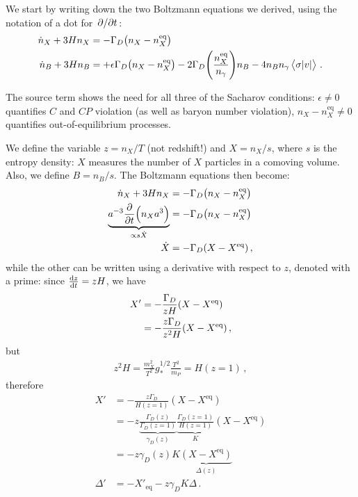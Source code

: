 \documentclass[main.tex]{subfiles}
\begin{document}

We start by writing down the two Boltzmann equations we derived, using the notation of a dot for \(\pdv*{}{t}\):
%
\begin{align}
\dot{n}_X + 3 H n_X &= - \Gamma _D \qty(n_X - n_X^{\text{eq}})\\
\dot{n}_B + 3 H n_B &= + \epsilon \Gamma _D \qty(n_X - n_X^{\text{eq}}) -2 \Gamma _D \qty(\frac{n_X^{\text{eq}}}{n_\gamma }) n_B - 4 n_B n_\gamma \expval{\sigma \abs{v}}
\,.
\end{align}

The source term shows the need for all three of the Sacharov conditions: \(\epsilon \neq 0 \) quantifies \(C\) and \(CP\) violation (as well as baryon number violation), \(n_X - n_X^{\text{eq}} \neq 0\) quantifies out-of-equilibrium processes. 

We define the variable \(z = n_X / T\) (not redshift!) and \(X = n_X / s\), where \(s\) is the entropy density: \(X\) measures the number of \(X\) particles in a comoving volume. Also, we define \(B = n_B / s\). 
The Boltzmann equations then become: 
%
\begin{align}
\dot{n}_X + 3 H n_X &= - \Gamma _D \qty(n_X - n_X^{\text{eq}})\\
\underbrace{a^{-3} \pdv{}{t} \qty(n_X a^3)}_{\propto s \dot{X}} &= - \Gamma _D \qty(n_X - n_X^{\text{eq}}) \\
\dot{X} &= - \Gamma _D \qty(X - X^{\text{eq}})
\,,
\end{align}
%
while the other can be written using a derivative with respect to \(z\), denoted with a prime: since \(\dv{z}{t} = z H\), we have
%
\begin{align}
X' &= - \frac{\Gamma_D}{z H } \qty(X - X^{\text{eq}})  \\
&= - \frac{z \Gamma _D}{z^2 H} \qty(X - X^{\text{eq}})
\,,
\end{align}
%
but 
%
\begin{align}
z^2 H = \frac{m_X^2}{T^2} g_*^{1/2} \frac{T^2}{m_P} = H (z=1)
\,,
\end{align}
%
therefore 
%
\begin{align}
X' &= - \frac{z\Gamma_D}{H(z=1)} (X - X^{\text{eq}})  \\
&= - z  \underbrace{\frac{\Gamma _D (z)}{\Gamma _D(z=1)}}_{\gamma _D (z)} \underbrace{\frac{\Gamma _D (z=1)}{H(z=1)}}_{K} (X - X^{\text{eq}})  \\
&= -z \gamma _D(z) K \underbrace{(X - X^{\text{eq}})}_{\Delta (z)}  \\
\Delta '&= - X'_{\text{eq}} - z\gamma _D K \Delta  
\,.
\end{align}
\end{document}
